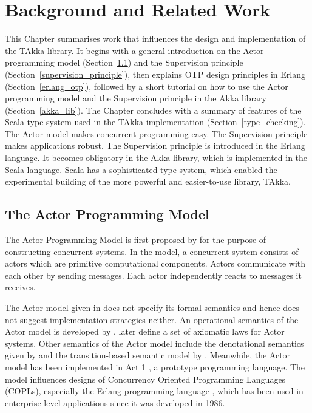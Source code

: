 \chapter{Background and Related Work}
\label{background}

This Chapter summarises work that influences the design and implementation of 
the TAkka library.  It begins with a general introduction on the 
Actor programming model (Section~\ref{actor_general}) and the Supervision principle
(Section~\ref{supervision_principle}), then explains OTP design 
principles in Erlang (Section~\ref{erlang_otp}), followed by a short tutorial on how to use the Actor 
programming model and the Supervision principle in the Akka library (Section~\ref{akka_lib}).  The 
Chapter concludes with a summary of features of the Scala type system used in the TAkka 
implementation (Section~\ref{type_checking}).  The Actor model makes concurrent programming easy.  The 
Supervision principle makes applications robust.  The Supervision principle is 
introduced in the Erlang language.  It becomes obligatory in the Akka library, 
which is implemented in the Scala language.  Scala has a sophisticated type 
system, which enabled the experimental building of the more powerful and 
easier-to-use library, TAkka.


\section{The Actor Programming Model}
\label{actor_general}

The Actor Programming Model is first proposed by \citet{Hewitt:1973} for the 
purpose of constructing concurrent systems.  In the model, a concurrent system
consists of actors which are primitive computational components. Actors 
communicate with each other by sending messages.  Each actor independently 
reacts to messages it receives.

The Actor model given in \citep{Hewitt:1973} does not specify its formal 
semantics and hence does not suggest implementation strategies neither.  An 
operational semantics of the Actor model is developed by 
\citet{actor_operational_semantics}.  \citet{acot_laws} later define a set of 
axiomatic laws for Actor systems.  Other semantics of the Actor model include 
the denotational semantics given by \citet{actor_denotational_semantics} and 
the transition-based semantic model by \citet{actor_transition_semantic}.
Meanwhile, the Actor model has been implemented in Act 1 \citep{Act1}, a 
prototype programming language.  The model influences designs of 
Concurrency Oriented Programming Languages (COPLs), especially the Erlang 
programming language \citep{ArmstrongErlang}, which has been used in 
enterprise-level applications since it was developed in 1986.
  
